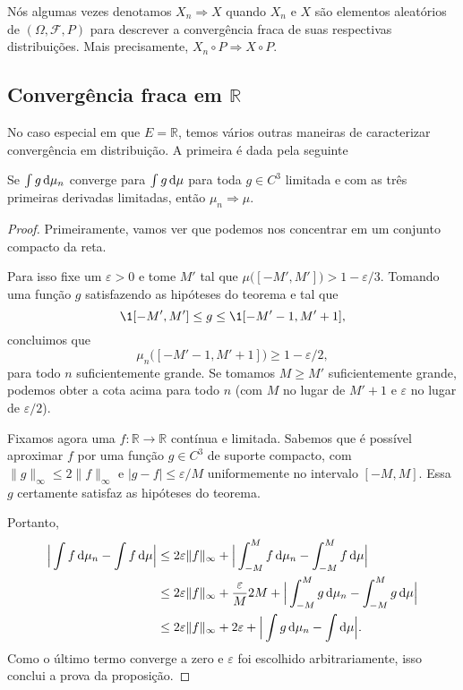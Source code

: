 Nós algumas vezes denotamos $X_n \Rightarrow X$ quando $X_n$ e $X$ são elementos aleatórios de $(\Omega, \mathcal{F}, P)$ para descrever a convergência fraca de suas respectivas distribuições.
Mais precisamente, $X_n \circ P \Rightarrow X \circ P$.

\subsection{Convergência fraca em \texorpdfstring{$\mathbb{R}$}{R}}

No caso especial em que $E = \mathbb{R}$, temos vários outras maneiras de caracterizar convergência em distribuição.
A primeira é dada pela seguinte

\begin{proposition}
  \label{p:conv_distr_suave}
  Se $\int g \mathop{}\!\mathrm{d} \mu_n$ converge para $\int g \mathop{}\!\mathrm{d} \mu$ para toda $g \in C^3$ limitada e com as três primeiras derivadas limitadas, então $\mu_n \Rightarrow \mu$.
\end{proposition}

\begin{proof}
  Primeiramente, vamos ver que podemos nos concentrar em um conjunto compacto da reta.

  Para isso fixe um $\varepsilon > 0$ e tome $M'$ tal que $\mu\big( [-M', M'] \big) > 1 - \varepsilon / 3$.
  Tomando uma função $g$ satisfazendo as hipóteses do teorema e tal que
  \begin{equation}
    \1{[-M',M']} \leq g \leq \1{[-M'-1,M'+1]},
  \end{equation}
  concluimos que
  \begin{equation}
    \mu_n \big( [-M'-1, M'+1] \big) \geq 1 - \varepsilon/2,
  \end{equation}
  para todo $n$ suficientemente grande.
  Se tomamos $M \geq M'$ suficientemente grande, podemos obter a cota acima para todo $n$ (com $M$ no lugar de $M'+1$ e $\varepsilon$ no lugar de $\varepsilon/2$).

  Fixamos agora uma $f: \mathbb{R} \to \mathbb{R}$ contínua e limitada.
  Sabemos que é possível aproximar $f$ por uma função $g \in C^3$ de suporte compacto, com $\lVert g \rVert_\infty \leq 2 \lVert f \rVert_\infty$ e $|g - f| \leq \varepsilon/M$ uniformemente no intervalo $[-M,M]$.
  Essa $g$ certamente satisfaz as hipóteses do teorema.

  Portanto,
  \begin{equation*}
    \begin{split}
      \Big| \int f \d \mu_n - \int f \d \mu\Big| & \leq 2 \varepsilon \lVert f \rVert_\infty + \Big| \int_{-M}^M f \d \mu_n - \int_{-M}^M f \d \mu\Big|\\
      & \leq 2 \varepsilon \lVert f \rVert_\infty + \frac \varepsilon{M} 2 M + \Big| \int_{-M}^M g \d \mu_n - \int_{-M}^M g \d \mu\Big|\\
      & \leq 2 \varepsilon \lVert f \rVert_\infty + 2 \varepsilon + \Big| \int g \d \mu_n - \int \d \mu\Big|.
    \end{split}
  \end{equation*}
  Como o último termo converge a zero e $\varepsilon$ foi escolhido arbitrariamente, isso conclui a prova da proposição.
\end{proof}

